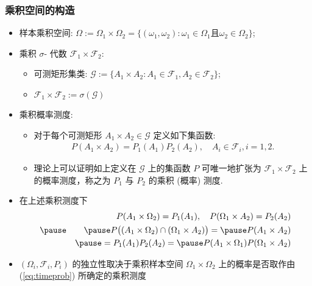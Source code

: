              \begin{frame}
               \frametitle{乘积空间的构造}
               \begin{itemize}[<+-|alert@+>]
               \item 样本乘积空间: $\Omega:=\Omega_1\times \Omega_2=\{(\omega_1,\omega_2):\omega_1\in\Omega_1\mbox{且}\omega_2\in \Omega_2\}$;
               \item 乘积 $\sigma$- 代数 $\mathcal{F}_1\times\mathcal{F}_2$:
                 \begin{itemize}[<+-|alert@+>]
                 \item 可测矩形集类: $\mathcal{G}:=\{A_1\times A_2: A_1\in\mathcal{F}_1, A_2\in \mathcal{F}_2\}$;
                 \item $\mathcal{F}_1\times \mathcal{F}_2:=\sigma(\mathcal{G})$
                 \end{itemize}
               \item 乘积概率测度:
                 \begin{itemize}[<+-|alert@+>]
                 \item 对于每个可测矩形 $A_1\times A_2\in \mathcal{G}$ 定义如下集函数:
                   \begin{eqnarray}\label{eq:timeprob}
                     P(A_1\times A_2)=P_1(A_1)P_2(A_2), \quad A_i\in\mathcal{F}_i, i=1,2.
                   \end{eqnarray}
                 \item 理论上可以证明如上定义在 $\mathcal{G}$ 上的集函数 $P$ 可唯一地扩张为 $\mathcal{F}_1\times\mathcal{F}_2$ 上的概率测度，称之为 $P_1$ 与 $P_2$ 的乘积 (概率) 测度.
                 \end{itemize}
               \item 在上述乘积测度下
                 \begin{eqnarray*}
                   &&P(A_1\times \Omega_2)=P_1(A_1), \quad P(\Omega_1\times A_2)=P_2(A_2)\\\pause
                   &&\pause P\big((A_1\times \Omega_2)\cap (\Omega_1\times A_2)\big)=\pause P(A_1\times A_2)\\
                   &&\pause = P_1(A_1)P_2(A_2)=\pause P(A_1\times\Omega_1)P(\Omega_1\times A_2)
                 \end{eqnarray*}
               \item $(\Omega_i,\mathcal{F}_i,P_i)$ 的独立性取决于乘积样本空间 $\Omega_1\times\Omega_2$ 上的概率是否取作由 (\ref{eq:timeprob}) 所确定的乘积测度
               \end{itemize}
             \end{frame}


